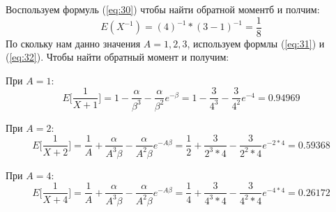 \documentclass[13pt]{article}
\begin{document}
Воспользуем формуль (\ref{eq:30}) чтобы найти обратной моментб и полчим:
\begin{equation*}
    E (X^{-1}) = (4)^{-1}*(3 - 1)^{-1} = \frac{1}{8}
\end{equation*}
По скольку нам данно значения $A = 1, 2, 3$, используем формлы (\ref{eq:31}) и (\ref{eq:32}). Чтобы найти обратный момент и получим:

При $A=1$:
\begin{equation*}
    E\bigg[\frac{1}{X+1}\bigg] = 1 - \frac{\alpha}{\beta^{3}} - \frac{\alpha}{\beta^{2}}e^{-\beta}  = 1 -\frac{3}{4^{3}} - \frac{3}{4^{2}}e^{-4} = 0.94969
\end{equation*}

При $A=2$:
\begin{equation*}
    E\bigg[\frac{1}{X+2}\bigg]  = \frac{1}{A} + \frac{\alpha}{A^{3}\beta} - \frac{\alpha}{A^{2}\beta}e^{-A\beta} = \frac{1}{2} + \frac{3}{2^{3} *4} - \frac{3}{2^{2}*4}e^{-2*4}=  0.59368
\end{equation*}

При $A=4$:
\begin{equation*}
    E\bigg[\frac{1}{X+4}\bigg] = \frac{1}{A} + \frac{\alpha}{A^{3}\beta} - \frac{\alpha}{A^{2}\beta}e^{-A\beta} = \frac{1}{4} + \frac{3}{4^{3} *4} - \frac{3}{4^{2}*4}e^{-4*4} = 0.26172
\end{equation*}

\newpage
\end{document}

